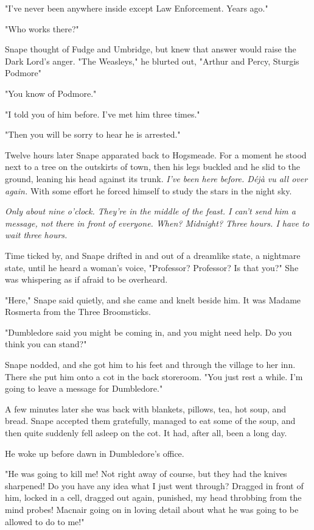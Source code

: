 "I've never been anywhere inside except Law Enforcement. Years ago."

"Who works there?"

Snape thought of Fudge and Umbridge, but knew that answer would raise the Dark Lord's anger. "The Weasleys," he blurted out, "Arthur and Percy, Sturgis Podmore{\el}"

"You know of Podmore."

"I told you of him before. I've met him three times."

"Then you will be sorry to hear he is arrested."

Twelve hours later Snape apparated back to Hogsmeade. For a moment he stood next to a tree on the outskirts of town, then his legs buckled and he slid to the ground, leaning his head against its trunk. \emph{I've been here before. Déjà vu all over again.} With some effort he forced himself to study the stars in the night sky.

\emph{Only about nine o'clock. They're in the middle of the feast. I can't send him a message, not there in front of everyone. When? Midnight? Three hours. I have to wait three hours.}

Time ticked by, and Snape drifted in and out of a dreamlike state, a nightmare state, until he heard a woman's voice, "Professor? Professor? Is that you?" She was whispering as if afraid to be overheard.

"Here," Snape said quietly, and she came and knelt beside him. It was Madame Rosmerta from the Three Broomsticks.

"Dumbledore said you might be coming in, and you might need help. Do you think you can stand?"

Snape nodded, and she got him to his feet and through the village to her inn. There she put him onto a cot in the back storeroom. "You just rest a while. I'm going to leave a message for Dumbledore."

A few minutes later she was back with blankets, pillows, tea, hot soup, and bread. Snape accepted them gratefully, managed to eat some of the soup, and then quite suddenly fell asleep on the cot. It had, after all, been a long day.

He woke up before dawn in Dumbledore's office.

\sbreak

"He was going to kill me! Not right away of course, but they had the knives sharpened! Do you have any idea what I just went through? Dragged in front of him, locked in a cell, dragged out again, punished, my head throbbing from the mind probes! Macnair going on in loving detail about what he was going to be allowed to do to me!"

